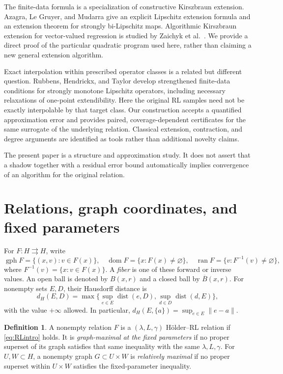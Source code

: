 \documentclass[11pt]{article}
\numberwithin{equation}{section}
\theoremstyle{definition}
\newtheorem{definition}[theorem]{Definition}
\theoremstyle{remark}
\newcommand{\gph}{\operatorname{gph}}
\newcommand{\dom}{\operatorname{dom}}
\newcommand{\ran}{\operatorname{ran}}
\newcommand{\dist}{\operatorname{dist}}
\newcommand{\norm}[1]{\lVert #1\rVert}
\begin{document}
The finite-data formula is a specialization of constructive Kirszbraun
extension. Azagra, Le Gruyer, and Mudarra
\cite[Theorems~2 and~8]{AzagraLeGruyerMudarra} give an explicit Lipschitz
extension formula and an extension theorem for strongly bi-Lipschitz maps.
Algorithmic Kirszbraun extension for vector-valued regression is studied
by Zaichyk et al.\ \cite{ZaichykEtAl}. We provide a direct proof of the
particular quadratic program used here, rather than claiming a new
general extension algorithm.

Exact interpolation within prescribed operator classes is a related but
different question. Rubbens, Hendrickx, and Taylor
\cite[Section~3.3]{RubbensHendrickxTaylor} develop strengthened finite-data
conditions for strongly monotone Lipschitz operators, including necessary
relaxations of one-point extendibility. Here the original RL samples need
not be exactly interpolable by that target class. Our construction accepts
a quantified approximation error and provides paired, coverage-dependent
certificates for the same surrogate of the underlying relation. Classical
extension, contraction, and
degree arguments are identified as tools rather than additional novelty
claims.

The present paper is a structure and approximation study. It does not
assert that a shadow together with a residual error bound automatically
implies convergence of an algorithm for the original relation.

\section{Relations, graph coordinates, and fixed parameters}\label{sec:setup}

For $F:H\rightrightarrows H$, write
\[
 \gph F=\{(x,v):v\in F(x)\},\quad
 \dom F=\{x:F(x)\ne\varnothing\},\quad
 \ran F=\{v:F^{-1}(v)\ne\varnothing\},
\]
where $F^{-1}(v)=\{x:v\in F(x)\}$. A \emph{fiber} is one of these
forward or inverse values. An open ball is denoted by $B(x,r)$ and a closed
ball by $\overline B(x,r)$. For nonempty sets $E,D$, their Hausdorff distance
is
\[
 d_H(E,D)=\max\{\sup_{e\in E}\dist(e,D),\sup_{d\in D}\dist(d,E)\},
\]
with the value $+\infty$ allowed. In particular,
$d_H(E,\{a\})=\sup_{e\in E}\norm{e-a}$.

\begin{definition}\label{def:RL}
A nonempty relation $F$ is a $(\lambda,L,\gamma)$ H\"older--RL relation
if \eqref{eq:RLintro} holds. It is \emph{graph-maximal at the fixed
parameters} if no proper superset of its graph satisfies that same
inequality with the same $\lambda,L,\gamma$.
For $U,W\subset H$, a nonempty graph $G\subset U\times W$ is
\emph{relatively maximal} if no proper superset within $U\times W$
satisfies the fixed-parameter inequality.
\end{definition}
\end{document}
